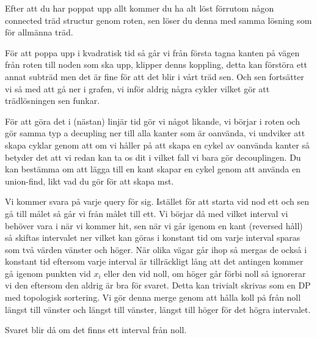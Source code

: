 \documentclass[a4paper, 12pt]{article}
\newenvironment{problem}[2][Problem]{\begin{trivlist}
\item[\hskip \labelsep {\bfseries #1}\hskip \labelsep {\bfseries #2.}]}{\end{trivlist}}
\begin{document}
\begin{problem}{3}
    Efter att du har poppat upp allt kommer du ha alt löst förrutom någon connected träd structur genom roten, sen löser du denna med samma lösning som för allmänna träd.


    För att poppa upp i kvadratisk tid så går vi från första tagna kanten på vägen från roten till noden som ska upp, klipper denns koppling, detta kan förstöra ett annat subträd men det är fine för att det blir i vårt träd sen. Och sen fortsätter vi så med att gå ner i grafen, vi inför aldrig några cykler vilket gör att trädlösningen sen funkar.

    För att göra det i (nästan) linjär tid gör vi något likande, vi börjar i roten och gör samma typ a decupling ner till alla kanter som är oanvända, vi undviker att skapa cyklar genom att om vi håller på att skapa en cykel av oanvända kanter så betyder det att vi redan kan ta os dit i vilket fall vi bara gör decouplingen. Du kan bestämma om att lägga till en kant skapar en cykel genom att använda en union-find, likt vad du gör för att skapa mst.
\end{problem}

\newpage

\begin{problem}{4}
    Vi kommer svara på varje query för sig. Istället för att starta vid nod ett och sen gå till målet så går vi från målet till ett. Vi börjar då med vilket interval vi behöver vara i när vi kommer hit, sen när vi går igenom en kant (reversed håll) så skiftas intervalet ner vilket kan göras i konstant tid om varje interval sparas som två värden vänster och höger. När olika vägar går ihop så mergas de också i konstant tid eftersom varje interval är tillräckligt lång att det antingen kommer gå igenom punkten vid $x_i$ eller den vid noll, om höger går förbi noll så ignorerar vi den eftersom den aldrig är bra för svaret. Detta kan trivialt skrivas som en DP med topologisk sortering. Vi gör denna merge genom att hålla koll på från noll längst till vänster och längst till vänster, längst till höger för det högra intervalet.

    

    Svaret blir då om det finns ett interval från noll.
\end{problem}
\end{document}
